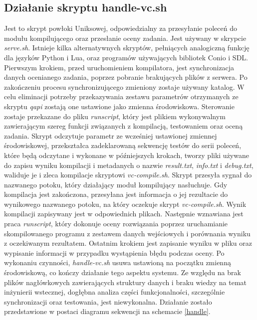 \subsection{Działanie skryptu handle-vc.sh}
Jest to skrypt powłoki Uniksowej, odpowiedzialny za przesyłanie poleceń do modułu kompilującego oraz przesłanie oceny zadania. Jest używany w skrypcie \textit{serve.sh}. Istnieje kilka alternatywnych skryptów, pełniących analogiczną funkcję dla języków Python i Lua, oraz programów używających bibliotek Conio i SDL. Pierwszym krokiem, przed uruchomieniem kompilatora, jest synchronizacja danych ocenianego zadania, poprzez pobranie brakujących plików z serwera. Po zakończeniu procesu synchronizującego zmieniony zostaje używany katalog. W celu eliminacji potrzeby przekazywania zestawu parametrów otrzymanych ze skryptu \textit{qapi} zostają one ustawione jako zmienna środowiskowa. Sterowanie zostaje przekazane do pliku \textit{runscript}, który jest plikiem wykonywalnym zawierającym szereg funkcji związanych z kompilacją, testowaniem oraz oceną zadania. Skrypt odczytuje parametr ze wcześniej ustawionej zmiennej środowiskowej, przekształca zadeklarowaną sekwencję testów do serii poleceń, które będą odczytane i wykonane w późniejszych krokach, tworzy pliki używane do zapisu wyniku kompilacji i metadanych o nazwie \textit{result.txt}, \textit{info.txt} i \textit{debug.txt}, waliduje je i zleca kompilacje skryptowi \textit{vc-compile.sh}. Skrypt przesyła sygnał do nazwanego potoku, który działający moduł kompilujący nasłuchuje. Gdy kompilacja jest zakończona, przesyłana jest informacja o jej rezultacie do wynikowego nazwanego potoku, na który oczekuje skrypt \textit{vc-compile.sh}. Wynik kompilacji zapisywany jest w odpowiednich plikach. Następnie wznawiana jest praca \textit{runscript}, który dokonuje oceny rozwiązania poprzez uruchamianie skompilowanego programu z zestawem danych wejściowych i porównania wyniku z oczekiwanym rezultatem. Ostatnim krokiem jest zapisanie wyniku w pliku oraz wypisanie informacji w przypadku wystąpienia błędu podczas oceny. Po wykonaniu czynności, \textit{handle-vc.sh} usuwa ustawioną na początku zmienną środowiskową, co kończy działanie tego aspektu systemu. Ze względu na brak plików nagłówkowych zawierających struktury danych i braku wiedzy na temat inżynierii wstecznej, dogłębna analiza części funkcjonalności, szczególnie synchronizacji oraz testowania, jest niewykonalna. Działanie zostało przedstawione w postaci diagramu sekwencji na schemacie \ref{handle}.
